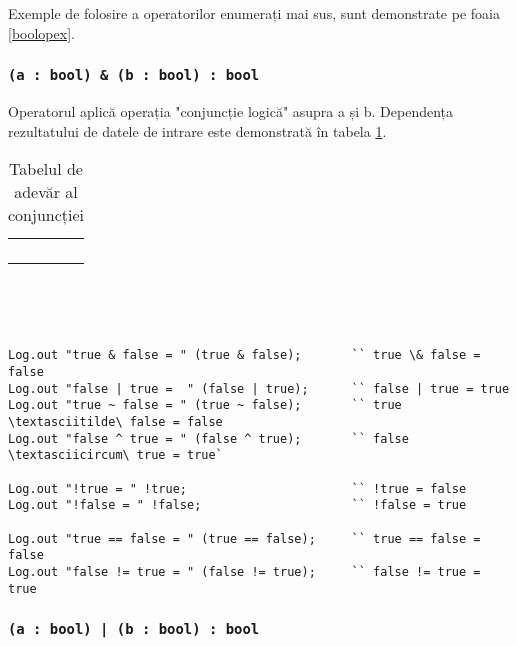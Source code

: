 Exemple de folosire a operatorilor enumerați mai sus, sunt demonstrate pe foaia \ref{boolopex}.

\subsubsection{\lstinline|(a : bool) & (b : bool) : bool|}

Operatorul aplică operația "conjuncție logică" asupra a și b. Dependența rezultatului de datele de intrare este demonstrată în tabela \ref{conjtable}.

\begin{table}[htb]
	\caption{Tabelul de adevăr al conjuncției}
	\label{conjtable}
	\begin{tabular}{|c|c|c|}
		\hline
		\code{a} & \code{b} & \code{a \& b} \\ \hline
		\false{} & \false{} & \false{}  	\\ \hline
		\false{} & \true{}  & \false{}  	\\ \hline
		\true{}  & \false{} & \false{}  	\\ \hline
		\true{}  & \true{}  & \true{}   	\\ \hline
	\end{tabular}
	\vspace{0em}
\end{table}

\

\

\begin{lstlisting}[caption=Exemple de folosite a operatorilor asupra tipului bool, label=boolopex]
Log.out "true & false = " (true & false);		`` true \& false = false
Log.out "false | true =  " (false | true);		`` false | true = true
Log.out "true ~ false = " (true ~ false);		`` true \textasciitilde\ false = false
Log.out "false ^ true = " (false ^ true);		`` false \textasciicircum\ true = true`

Log.out "!true = " !true;						`` !true = false
Log.out "!false = " !false;				  		`` !false = true

Log.out "true == false = " (true == false);		`` true == false = false
Log.out "false != true = " (false != true);		`` false != true = true
\end{lstlisting}

\subsubsection{\lstinline`(a : bool) | (b : bool) : bool`}

